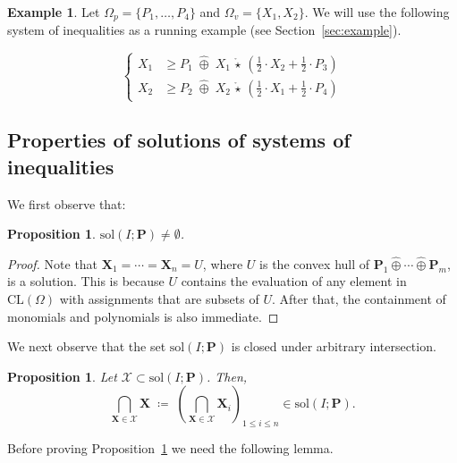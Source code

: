 \documentclass[10pt]{amsart}
\theoremstyle{plain}
\newtheorem{proposition}[lemma]{Proposition}
\theoremstyle{definition}
\newtheorem{example}[lemma]{Example}
\providecommand{\bP}[0]{\ensuremath{\mathbf P}\xspace}
\providecommand{\bX}[0]{\ensuremath{\mathbf X}\xspace}
\let\leq\leqslant
\let\geq\geqslant
\providecommand{\defeq}[0]{\ensuremath{\;\coloneqq\;}\xspace}
\providecommand{\cplus}[0]{\ensuremath{\hat{\oplus}}\xspace}
\providecommand{\cmult}[0]{\ensuremath{{\,\mathring{\star}\,}}\xspace}
\providecommand{\CL}[0]{\ensuremath{\mathrm{CL}}\xspace}
\providecommand{\sol}{\ensuremath{\mathrm{sol}}\xspace}
\begin{document}
\begin{example}
\label{eg:working-example}
Let $\Omega_p = \{P_1,\ldots,P_4\}$ and $\Omega_v = \{X_1,X_2\}$.
We will use the following system of inequalities as a running example
(see Section~\ref{sec:example}).

\begin{equation}
\left\{
\begin{aligned}
    X_1 &\geq P_1  \;\cplus\;  X_1\cmult \left(\frac12\cdot X_2 + \frac12\cdot P_3\right) \\
    X_2 &\geq P_2  \;\cplus\;  X_2\cmult \left(\frac12\cdot X_1 + \frac12\cdot P_4\right) 
\end{aligned}
\right.
    \label{eqn:running-example}
\end{equation}
\end{example}












\subsection{Properties of solutions of systems of inequalities}
\label{subsec:sol}
We first observe that:
\begin{proposition}
\label{prop:sol}
    $\sol(I;\bP)\neq \emptyset$.
\end{proposition}
\begin{proof}
    Note that $\bX_1 = \dotsi = \bX_n = U$, where $U$ is the convex hull of $\bP_1 \cplus \dotsi \cplus \bP_m$, is a solution. 
    This is because $U$ contains the evaluation of any element in $\CL(\Omega)$ with assignments that are subsets of $U$. 
    After that, the containment of monomials and polynomials is also immediate. 
\end{proof}
We next observe that the set $\sol(I;\bP)$ is closed under arbitrary intersection.

\begin{proposition}
\label{prop:closure-under-intersection}
   Let $\mathcal{X} \subset \sol(I;\bP)$.
    Then, 
    \[
    \bigcap_{\bX \in \mathcal{X}} \bX \defeq \left(\bigcap_{\bX \in \mathcal{X}}\bX_i\right)_{1\leq i \leq n} \in \sol(I;\bP).
    \]
\end{proposition}

Before proving Proposition~\ref{prop:closure-under-intersection} we need the following lemma.
\end{document}
